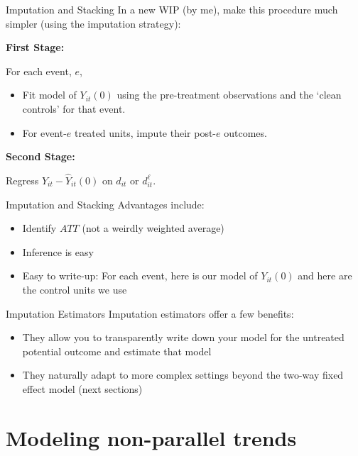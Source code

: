 \documentclass[t]{beamer}
\begin{document}
\begin{frame}{Imputation and Stacking}
  In a new WIP (by me), make this procedure much simpler (using the imputation strategy):

  \bigskip
  \textbf{First Stage:} 
  
  For each event, $e$,
  \begin{itemize}
    \item Fit model of $Y_{it}(0)$ using the pre-treatment observations and the `clean controls' for that event. 
    
    \item For event-$e$ treated units, impute their post-$e$ outcomes. 
  \end{itemize}

  \bigskip
  \textbf{Second Stage:} 
  
  Regress $Y_{it} - \hat{Y}_{it}(0)$ on $d_{it}$ or $d_{it}^\ell$. 
\end{frame}

\begin{frame}{Imputation and Stacking}
  Advantages include:
  \begin{itemize}
    \item Identify $ATT$ (not a weirdly weighted average)
    \item Inference is easy
    \item Easy to write-up: For each event, here is our model of $Y_{it}(0)$ and here are the control units we use
  \end{itemize}
\end{frame}

\begin{frame}{Imputation Estimators}
  Imputation estimators offer a few benefits:
  \begin{itemize}
    \item They allow you to transparently write down your model for the untreated potential outcome and estimate that model
    \item They naturally adapt to more complex settings beyond the two-way fixed effect model (next sections)
  \end{itemize}
\end{frame}

\section{Modeling non-parallel trends}
\end{document}
